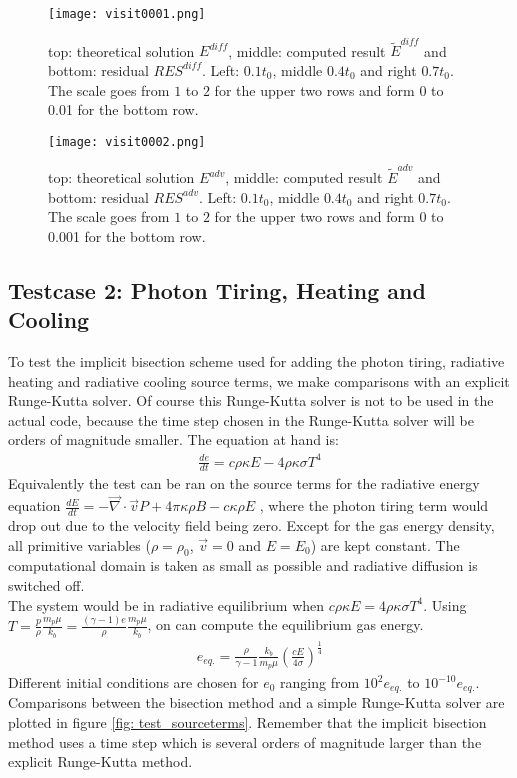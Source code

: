 \begin{figure}
\texttt{[image: visit0001.png]}
\label{fig: test_diffusion}
\caption{top: theoretical solution $E^{diff}$, middle: computed result $\tilde{E}^{diff}$ and bottom: residual $RES^{diff}$. Left: $0.1 t_0$, middle $0.4 t_0$ and right $0.7 t_0$. The scale goes from $1$ to $2$ for the upper two rows and form 0 to 0.01 for the bottom row.}
\end{figure}

\begin{figure}
\texttt{[image: visit0002.png]}
\label{fig: test_advection}
\caption{top: theoretical solution $E^{adv}$, middle: computed result $\tilde{E}^{adv}$ and bottom: residual $RES^{adv}$. Left: $0.1 t_0$, middle $0.4 t_0$ and right $0.7 t_0$. The scale goes from $1$ to $2$ for the upper two rows and form 0 to 0.001 for the bottom row.}
\end{figure}



\subsection{Testcase 2: Photon Tiring, Heating and Cooling}
To test the implicit bisection scheme used for adding the photon tiring, radiative heating and radiative cooling source terms, we make comparisons with an explicit Runge-Kutta solver. Of course this Runge-Kutta solver is not to be used in the actual code, because the time step chosen in the Runge-Kutta solver will be orders of magnitude smaller. The equation at hand is:
\begin{align}
\frac{d e}{dt} = c \rho \kappa E - 4 \rho \kappa \sigma T^4
\end{align}
Equivalently the test can be ran on the source terms for the radiative energy equation $\frac{dE}{dt} = - \vec{\nabla} \cdot \vec{v} P + 4\pi \kappa\rho B - c \kappa \rho E$ , where the photon tiring term would drop out due to the velocity field being zero.
Except for the gas energy density, all primitive variables ($\rho = \rho_0$, $\vec{v} = 0$ and $E = E_0$) are kept constant. The computational domain is taken as small as possible and radiative diffusion is switched off. \\

The system would be in radiative equilibrium when $c \rho \kappa E = 4 \rho \kappa \sigma T^4$. Using $T =  \frac{p}{\rho} \frac{m_p \mu}{k_b}= \frac{(\gamma - 1)e}{\rho} \frac{m_p \mu}{k_b}$, on can compute the equilibrium gas energy.
\begin{align}
e_{eq.} = \frac{\rho}{\gamma - 1} \frac{k_b}{m_p \mu}\left( \frac{c E}{4 \sigma} \right)^\frac{1}{4}
\end{align}
Different initial conditions are chosen for $e_0$ ranging from $10^2 e_{eq.}$ to $10^{-10} e_{eq.}$. Comparisons between the bisection method and a simple Runge-Kutta solver are plotted in figure \ref{fig: test_sourceterms}. Remember that the implicit bisection method uses a time step which is several orders of magnitude larger than the explicit Runge-Kutta method.

